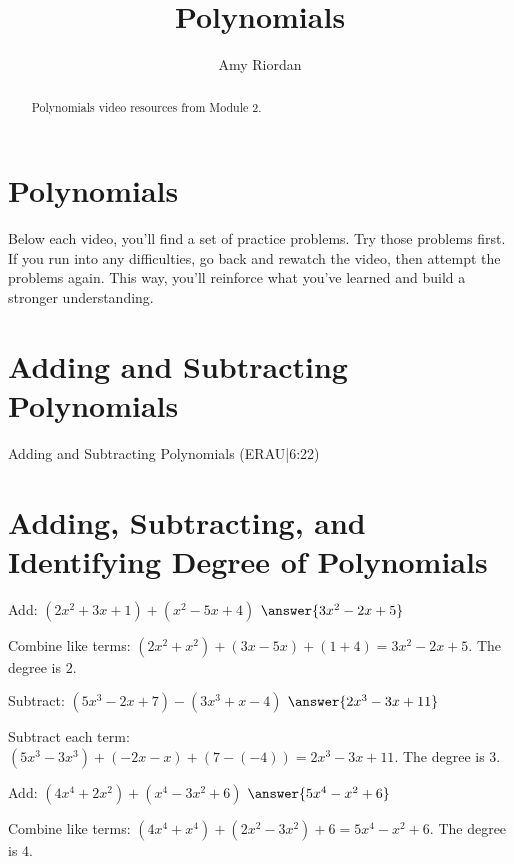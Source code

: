 \documentclass{ximera}
\title{Polynomials}
\author{Amy Riordan}
\begin{document}
\begin{abstract}
Polynomials video resources from Module 2.
\end{abstract}
\maketitle

\section*{Polynomials}

Below each video, you’ll find a set of practice problems. Try those problems first. If you run into any difficulties, go back and rewatch the video, then attempt the problems again. This way, you’ll reinforce what you’ve learned and build a stronger understanding.

\section*{Adding and Subtracting Polynomials}

Adding and Subtracting Polynomials (ERAU|6:22)



\section*{Adding, Subtracting, and Identifying Degree of Polynomials}

\begin{problem}
Add: $(2x^2 + 3x + 1) + (x^2 - 5x + 4)$ $\answer{3x^2 - 2x + 5}$
\begin{feedback}
Combine like terms: $(2x^2 + x^2) + (3x - 5x) + (1 + 4) = 3x^2 - 2x + 5$. The degree is $2$.
\end{feedback}
\end{problem}

\begin{problem}
Subtract: $(5x^3 - 2x + 7) - (3x^3 + x - 4)$ $\answer{2x^3 - 3x + 11}$
\begin{feedback}
Subtract each term: $(5x^3 - 3x^3) + (-2x - x) + (7 - (-4)) = 2x^3 - 3x + 11$. The degree is $3$.
\end{feedback}
\end{problem}

\begin{problem}
Add: $(4x^4 + 2x^2) + (x^4 - 3x^2 + 6)$ $\answer{5x^4 - x^2 + 6}$
\begin{feedback}
Combine like terms: $(4x^4 + x^4) + (2x^2 - 3x^2) + 6 = 5x^4 - x^2 + 6$. The degree is $4$.
\end{feedback}
\end{problem}
\end{document}

